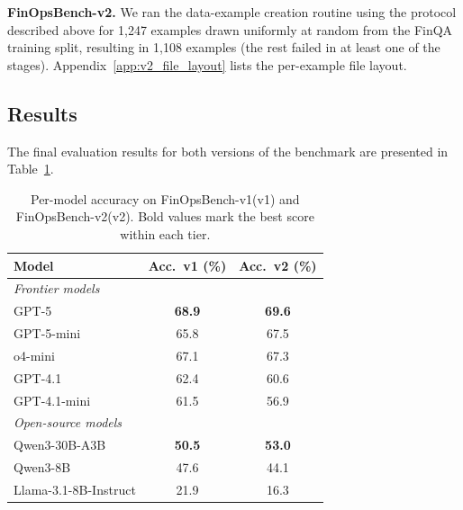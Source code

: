 \documentclass[11pt]{article}
\newcommand{\synthsubset}{FinOpsBench-v1}\xspace
\newcommand{\groundedfinqa}{FinOpsBench-v2}\xspace
\begin{document}

\noindent \textbf{\groundedfinqa.} We ran the data-example creation routine using the protocol described above for 1,247 examples drawn uniformly at random from the FinQA training split, resulting in 1,108 examples (the rest failed in at least one of the stages). Appendix~\ref{app:v2_file_layout} lists the per-example file layout.

\subsection{Results}

The final evaluation results for both versions of the benchmark are presented in Table~\ref{tab:results}.

\begin{table}[h]
\centering
\small
\setlength{\tabcolsep}{5pt}
\begin{tabular}{lcc}
\toprule
\textbf{Model} & \textbf{Acc.\ v1 (\%)} & \textbf{Acc.\ v2 (\%)} \\
\midrule
\multicolumn{3}{l}{\textit{Frontier models}} \\
GPT-5         & \textbf{68.9} & \textbf{69.6} \\
GPT-5-mini    & 65.8 & 67.5 \\
o4-mini       & 67.1 & 67.3 \\
GPT-4.1       & 62.4 & 60.6 \\
GPT-4.1-mini  & 61.5 & 56.9 \\
\midrule
\multicolumn{3}{l}{\textit{Open-source models}} \\
Qwen3-30B-A3B          & \textbf{50.5} & \textbf{53.0} \\
Qwen3-8B               & 47.6 & 44.1 \\
Llama-3.1-8B-Instruct  & 21.9 & 16.3 \\
\bottomrule
\end{tabular}
\caption{Per-model accuracy on \synthsubset (v1) and \groundedfinqa (v2). Bold values mark the best score within each tier.}
\label{tab:results}
\end{table}
\end{document}
